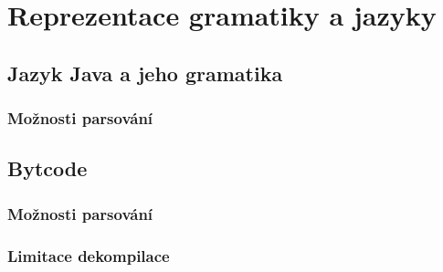 \chapter{Reprezentace gramatiky a jazyky}
	\section{Jazyk Java a jeho gramatika}
		\subsection{Možnosti parsování}
		
	\section{Bytcode}
		\subsection{Možnosti parsování}
		\subsection{Limitace dekompilace}